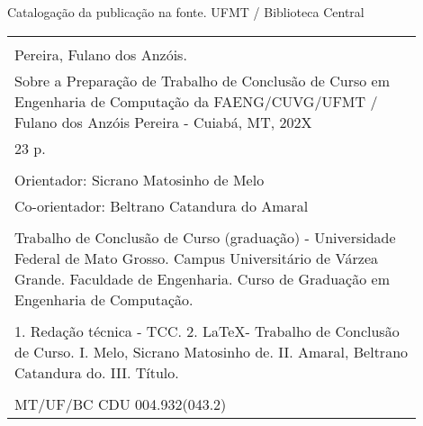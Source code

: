 %

\newpage

\begin{center}

\vspace*{\fill}

Catalogação da publicação na fonte.
UFMT / Biblioteca Central

\vspace{2ex}

\begin{tabular}{|p{0.9\linewidth}|} \hline
\\
Pereira, Fulano dos Anzóis.\\
\hspace{1em} Sobre a Preparação de Trabalho de Conclusão de Curso em Engenharia de Computação da FAENG/CUVG/UFMT /
Fulano dos Anzóis Pereira - Cuiabá, MT, 202X \\
\hspace{1em} 23 p. \\
\\
\hspace{1em} Orientador: Sicrano Matosinho de Melo \\
\hspace{1em} Co-orientador: Beltrano Catandura do Amaral \\
\\
\hspace{1em} Trabalho de Conclusão de Curso (graduação) - Universidade Federal de Mato Grosso.
Campus Universitário de Várzea Grande. Faculdade de Engenharia. Curso de Graduação em Engenharia de Computação. \\
\\
\hspace{1em} 1. Redação técnica - TCC. 2. \LaTeX - Trabalho de Conclusão de Curso.
I. Melo, Sicrano Matosinho de. II. Amaral, Beltrano Catandura do.
III. Título. \\
\\
MT/UF/BC \hfill CDU 004.932(043.2) \\ \hline
\end{tabular} 

\end{center}
